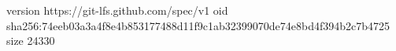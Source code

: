version https://git-lfs.github.com/spec/v1
oid sha256:74eeb03a3a4f8e4b853177488d11f9c1ab32399070de74e8bd4f394b2c7b4725
size 24330
